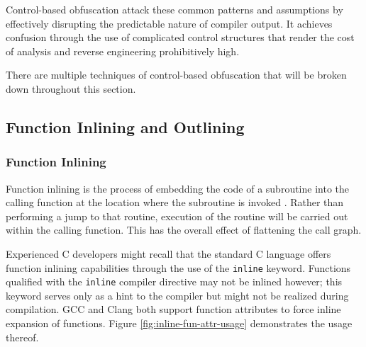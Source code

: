 \documentclass[conference]{IEEEtran}
\begin{document}
Control-based obfuscation attack these common patterns and assumptions by effectively disrupting the predictable nature of compiler output. It achieves confusion through the use of complicated control structures that render the cost of analysis and reverse engineering prohibitively high.

There are multiple techniques of control-based obfuscation that will be broken down throughout this section.


\subsection{Function Inlining and Outlining}
\subsubsection{Function Inlining}
Function inlining is the process of embedding the code of a subroutine into the calling function at the location where the subroutine is invoked \cite{b7}. Rather than performing a jump to that routine, execution of the routine will be carried out within the calling function. This has the overall effect of flattening the call graph. 

Experienced C developers might recall that the standard C language offers function inlining capabilities through the use of the \texttt{inline} keyword. Functions qualified with the \texttt{inline} compiler directive may not be inlined however; this keyword serves only as a hint to the compiler but might not be realized during compilation. GCC and Clang both support function attributes to force inline expansion of functions. Figure \ref{fig:inline-fun-attr-usage} demonstrates the usage thereof.
\end{document}
